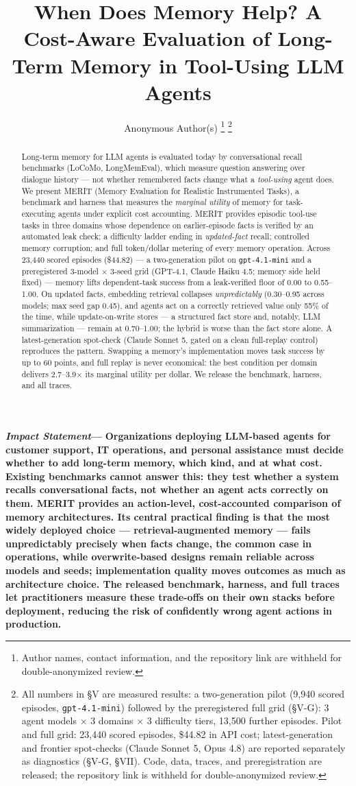\documentclass[journal]{IEEEtran}
\title{When Does Memory Help? A Cost-Aware Evaluation of Long-Term Memory in Tool-Using LLM Agents}
\author{Anonymous Author(s)%
\thanks{Author names, contact information, and the repository link are
withheld for double-anonymized review.}%
\thanks{All numbers in \S{}V are measured results: a two-generation pilot
(9{,}940 scored episodes, \texttt{gpt-4.1-mini}) followed by the
preregistered full grid (\S{}V-G): 3 agent models $\times$ 3 domains
$\times$ 3 difficulty tiers, 13{,}500 further episodes. Pilot and full
grid: 23{,}440 scored episodes, \$44.82 in API cost; latest-generation and
frontier spot-checks (Claude Sonnet 5, Opus 4.8) are reported separately
as diagnostics (\S{}V-G, \S{}VII). Code, data, traces, and preregistration
are released; the repository link is withheld for double-anonymized
review.}}
\newcommand{\merit}{\textsc{MERIT}}
\newenvironment{IEEEImpStatement}%
{\par\addvspace{0.6\baselineskip}\noindent\small%
\textbf{\textit{Impact Statement}---}\bfseries}%
{\par\addvspace{0.6\baselineskip}}}{}
\begin{document}
\maketitle

\begin{abstract}
Long-term memory for LLM agents is evaluated today by conversational recall
benchmarks (LoCoMo, LongMemEval), which measure question answering over
dialogue history --- not whether remembered facts change what a
\emph{tool-using} agent does. We present \merit{} (Memory Evaluation for
Realistic Instrumented Tasks), a benchmark and harness that measures the
\emph{marginal utility} of memory for task-executing agents under explicit
cost accounting. \merit{} provides episodic tool-use tasks in three domains
whose dependence on earlier-episode facts is verified by an automated leak
check; a difficulty ladder ending in \emph{updated-fact} recall; controlled
memory corruption; and full token/dollar metering of every memory
operation. Across 23{,}440 scored episodes (\$44.82) --- a two-generation
pilot on \texttt{gpt-4.1-mini} and a preregistered 3-model $\times$ 3-seed
grid (GPT-4.1, Claude Haiku 4.5; memory side held fixed) --- memory lifts
dependent-task success from a leak-verified floor of 0.00 to 0.55--1.00.
On updated facts, embedding retrieval collapses \emph{unpredictably}
(0.30--0.95 across models; max seed gap 0.45), and agents act on a
correctly retrieved value only 55\% of the time, while update-on-write
stores --- a structured fact store and, notably, LLM summarization ---
remain at 0.70--1.00; the hybrid is worse than the fact store alone. A
latest-generation spot-check (Claude Sonnet 5, gated on a clean
full-replay control) reproduces the pattern. Swapping a memory's
implementation moves task success by up to 60 points, and full replay is
never economical: the best condition per domain delivers
2.7--3.9$\times$ its marginal utility per dollar. We release the
benchmark, harness, and all traces.
\end{abstract}

\begin{IEEEImpStatement}
Organizations deploying LLM-based agents for customer support, IT
operations, and personal assistance must decide whether to add long-term
memory, which kind, and at what cost. Existing benchmarks cannot answer
this: they test whether a system recalls conversational facts, not whether
an agent acts correctly on them. MERIT provides an action-level,
cost-accounted comparison of memory architectures. Its central practical
finding is that the most widely deployed choice --- retrieval-augmented
memory --- fails unpredictably precisely when facts change, the common case
in operations, while overwrite-based designs remain reliable across models
and seeds; implementation quality moves outcomes as much as architecture
choice. The released benchmark, harness, and full traces let practitioners
measure these trade-offs on their own stacks before deployment, reducing
the risk of confidently wrong agent actions in production.
\end{IEEEImpStatement}
\end{document}
